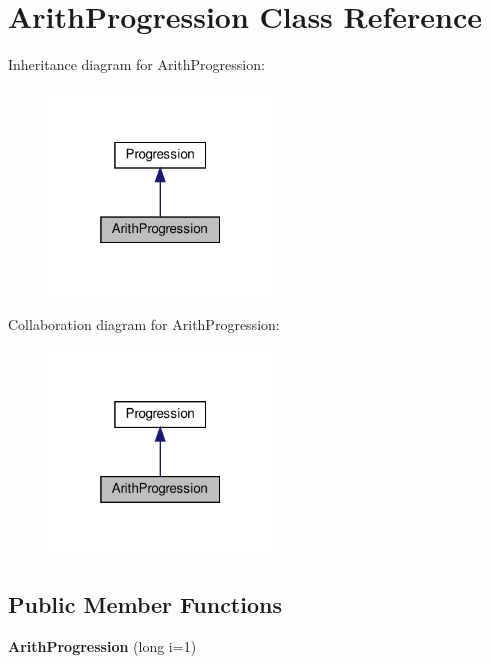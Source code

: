 \hypertarget{classArithProgression}{}\section{Arith\+Progression Class Reference}
\label{classArithProgression}


Inheritance diagram for Arith\+Progression\+:\nopagebreak
\begin{figure}[H]
\begin{center}
\leavevmode
\includegraphics[width=169pt]{classArithProgression__inherit__graph}
\end{center}
\end{figure}


Collaboration diagram for Arith\+Progression\+:\nopagebreak
\begin{figure}[H]
\begin{center}
\leavevmode
\includegraphics[width=169pt]{classArithProgression__coll__graph}
\end{center}
\end{figure}
\subsection*{Public Member Functions}
\begin{DoxyCompactItemize}
\item 
\mbox{\label{classArithProgression_a6c3f2d78b0c158f05662b2ad7d48dec5}} 
{\bfseries Arith\+Progression} (long i=1)
\end{DoxyCompactItemize}
